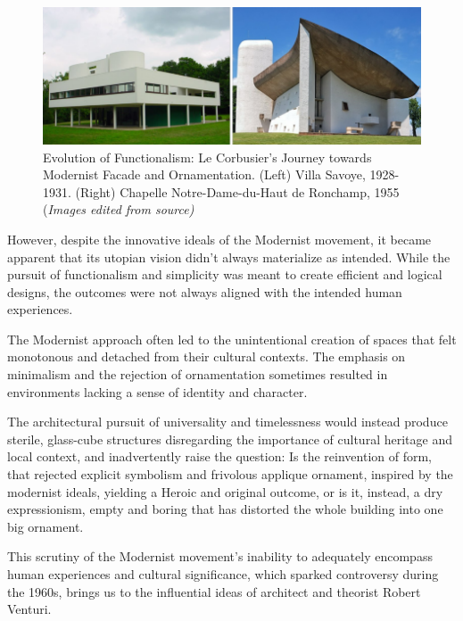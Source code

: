      \begin{figure}[htb]
          \centering
          \includegraphics[width= \linewidth]{Images/ModernistFacade}
          \caption{Evolution of Functionalism: Le Corbusier's Journey towards Modernist Facade and Ornamentation. (Left) Villa Savoye, 1928-1931. (Right) Chapelle Notre-Dame-du-Haut de Ronchamp, 1955 (\textit{Images edited from source)}}
          \label{fig:Modernistfacade}
        \end{figure}



However, despite the innovative ideals of the Modernist movement,  it became apparent that its utopian vision didn't always materialize as intended.
While the pursuit of functionalism and simplicity was meant to create efficient and logical designs, the outcomes were not always aligned with the intended human experiences.

The Modernist approach often led to the unintentional creation of spaces that felt monotonous and detached from their cultural contexts.
The emphasis on minimalism and the rejection of ornamentation sometimes resulted in environments lacking a sense of identity and character.

The architectural pursuit of universality and timelessness would instead produce sterile, glass-cube structures\cite{Schudel2018} disregarding the importance of cultural heritage and local context, and inadvertently raise the question: Is the reinvention of form, that rejected explicit symbolism and frivolous applique ornament, inspired by the modernist ideals,  yielding a Heroic and original outcome, or is it, instead, a dry expressionism, empty and boring that has distorted the whole building into one big ornament\cite{Venturi1971}.

This scrutiny of the Modernist movement's inability to adequately encompass human experiences and cultural significance, which sparked controversy during the 1960s, brings us to the influential ideas of architect and theorist Robert Venturi.

